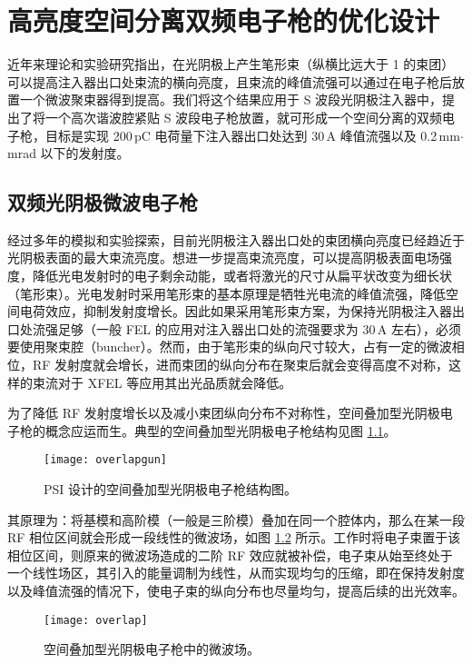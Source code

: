 \chapter{高亮度空间分离双频电子枪的优化设计}
\label{chap:GA}
近年来理论和实验研究指出，在光阴极上产生笔形束（纵横比远大于 1 的束团）可以提高注入器出口处束流的横向亮度，且束流的峰值流强可以通过在电子枪后放置一个微波聚束器得到提高。我们将这个结果应用于 S 波段光阴极注入器中，提出了将一个高次谐波腔紧贴 S 波段电子枪放置，就可形成一个空间分离的双频电子枪，目标是实现 200\,pC 电荷量下注入器出口处达到 30\,A 峰值流强以及 0.2\,mm$\cdot$mrad 以下的发射度。

\section{双频光阴极微波电子枪}
经过多年的模拟和实验探索，目前光阴极注入器出口处的束团横向亮度已经趋近于光阴极表面的最大束流亮度。想进一步提高束流亮度，可以提高阴极表面电场强度，降低光电发射时的电子剩余动能，或者将激光的尺寸从扁平状改变为细长状（笔形束）。光电发射时采用笔形束的基本原理是牺牲光电流的峰值流强，降低空间电荷效应，抑制发射度增长。因此如果采用笔形束方案，为保持光阴极注入器出口处流强足够（一般 FEL 的应用对注入器出口处的流强要求为 30\,A 左右），必须要使用聚束腔（buncher）。然而，由于笔形束的纵向尺寸较大，占有一定的微波相位，RF 发射度就会增长，进而束团的纵向分布在聚束后就会变得高度不对称，这样的束流对于 XFEL 等应用其出光品质就会降低。

为了降低 RF 发射度增长以及减小束团纵向分布不对称性，空间叠加型光阴极电子枪的概念应运而生。典型的空间叠加型光阴极电子枪结构见图 \ref{fig:overlapgun}。

\begin{figure}[htbp]
\centering
\texttt{[image: overlapgun]}
\caption{\label{fig:overlapgun} PSI 设计的空间叠加型光阴极电子枪结构图。}
\end{figure}

其原理为：将基模和高阶模（一般是三阶模）叠加在同一个腔体内，那么在某一段 RF 相位区间就会形成一段线性的微波场，如图 \ref{fig:linearfield} 所示。工作时将电子束置于该相位区间，则原来的微波场造成的二阶 RF 效应就被补偿，电子束从始至终处于一个线性场区，其引入的能量调制为线性，从而实现均匀的压缩，即在保持发射度以及峰值流强的情况下，使电子束的纵向分布也尽量均匀，提高后续的出光效率。

\begin{figure}[htbp]
\centering
\texttt{[image: overlap]}
\caption{\label{fig:linearfield} 空间叠加型光阴极电子枪中的微波场。}
\end{figure}

